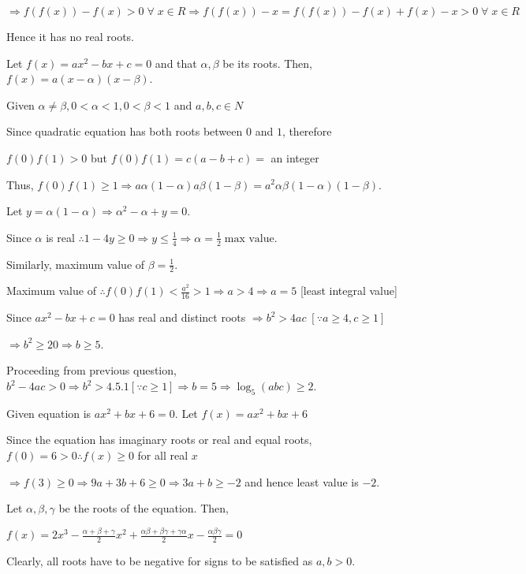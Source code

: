  $\Rightarrow f(f(x)) - f(x) > 0\;\forall\;x\in R\Rightarrow f(f(x)) - x = f(f(x)) - f(x) + f(x) - x > 0\;\forall\;x\in R$

  Hence it has no real roots.
\item Let $f(x) = ax^2 - bx + c = 0$ and that $\alpha, \beta$ be its roots. Then, $f(x) = a(x - \alpha)(x - \beta)$.

  Given $\alpha \ne \beta, 0 < \alpha < 1, 0 < \beta < 1$ and $a, b, c \in N$

  Since quadratic equation has both roots between $0$ and $1$, therefore

  $f(0)f(1) > 0$ but $f(0)f(1) = c(a - b + c) =$ an integer

  Thus, $f(0)f(1) \ge 1 \Rightarrow a\alpha(1 - \alpha)a\beta(1 - \beta) = a^2\alpha\beta(1 - \alpha)(1 -
  \beta)$.

  Let $y = \alpha(1 - \alpha) \Rightarrow \alpha^2 - \alpha + y = 0$.

  Since $\alpha$ is real $\therefore 1 - 4y \ge 0 \Rightarrow y \le \frac{1}{4} \Rightarrow \alpha =
  \frac{1}{2}\;\text{max value}$.

  Similarly, maximum value of $\beta = \frac{1}{2}$.

  Maximum value of $\therefore f(0)f(1) < \frac{a^2}{16} > 1\Rightarrow a > 4 \Rightarrow a = 5$ [least
    integral value]

  Since $ax^2 - bx + c = 0$ has real and distinct roots $\Rightarrow b^2 > 4ac\;[\because a\geq 4, c\geq 1]$

  $\Rightarrow b^2 \geq 20 \Rightarrow b\geq 5$.
\item Proceeding from previous question, $b^2 - 4ac > 0 \Rightarrow b^2 > 4.5.1 [\because c \ge 1]
  \Rightarrow b = 5\Rightarrow \log_5(abc) \ge 2$.
\item Given equation is $ax^2 + bx + 6 = 0$. Let $f(x) = ax^2 + bx + 6$

  Since the equation has imaginary roots or real and equal roots, $f(0) = 6 > 0\therefore f(x) \ge 0$ for
  all real $x$

  $\Rightarrow f(3) \ge 0 \Rightarrow 9a + 3b + 6 \ge 0\Rightarrow 3a + b \ge -2$ and hence least value is
  $-2$.
\item Let $\alpha, \beta, \gamma$ be the roots of the equation. Then,

  $f(x) = 2x^3 - \frac{\alpha + \beta + \gamma}{2}x^2 + \frac{\alpha\beta + \beta\gamma + \gamma\alpha}{2}x
  -\frac{\alpha\beta\gamma}{2} = 0$

  Clearly, all roots have to be negative for signs to be satisfied as $a, b > 0$.

